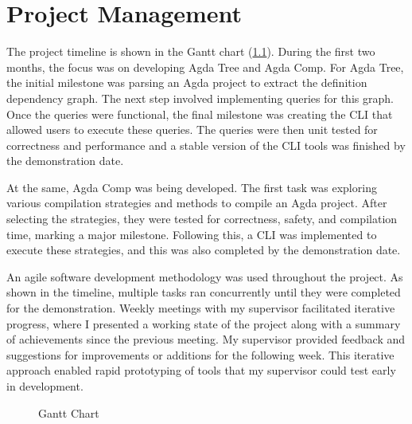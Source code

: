 
\chapter{Project Management}

The project timeline is shown in the Gantt chart (\cref{fig:Gantt}). During the
first two months, the focus was on developing Agda Tree and Agda Comp. For Agda
Tree, the initial milestone was parsing an Agda project to extract the
definition dependency graph. The next step involved implementing queries for
this graph. Once the queries were functional, the final milestone was creating
the CLI that allowed users to execute these queries. The queries were then
unit tested for correctness and performance and a stable version of
the CLI tools was finished by the demonstration date.

At the same, Agda Comp was being developed. The first task was exploring
various compilation strategies and methods to compile an Agda project. After
selecting the strategies, they were tested for correctness, safety, and
compilation time, marking a major milestone. Following this, a CLI was
implemented to execute these strategies, and this was also completed by
the demonstration date.

An agile software development methodology was used throughout the project.
As shown in the timeline, multiple tasks ran concurrently until they were
completed for the demonstration. Weekly meetings with my supervisor facilitated
iterative progress, where I presented a working state of the project along with
a summary of achievements since the previous meeting. My supervisor provided
feedback and suggestions for improvements or additions for the following week.
This iterative approach enabled rapid prototyping of tools that my supervisor
could test early in development.

\begin{figure}[H]
    \centering
    \label{fig:Gantt}
    \caption{Gantt Chart}
\end{figure} 


